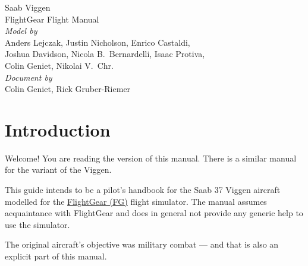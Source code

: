 
\usepackage[english]{babel}
\usepackage[utf8]{inputenc}
\usepackage[T1]{fontenc}
\usepackage{menukeys}
\usepackage{graphicx}
\usepackage{hyperref}
\usepackage{wallpaper}
\usepackage{xcolor}
\usepackage{geometry}
\usepackage{pdflscape}
\usepackage{gensymb}

\pagestyle{headings}


\begin{titlepage}
  \centering
  \sf
  {\Huge Saab  Viggen}
  \\[1cm]
  {\Huge FlightGear Flight Manual}
  \\[16cm]
  \color{white}
  \emph{Model by}\\
  Anders Lejczak, Justin Nicholson, Enrico Castaldi,\\
  Joshua Davidson, Nicola B.\ Bernardelli, Isaac Protiva,\\
  Colin Geniet, Nikolai V.\ Chr.\\
  \emph{Document by}\\
  Colin Geniet, Rick Gruber-Riemer
\end{titlepage}
\restoregeometry

\tableofcontents

\chapter{Introduction}

Welcome! You are reading the  version of this manual. There is a similar manual for the  variant of the Viggen.

This guide intends to be a pilot's handbook for the Saab 37 Viggen aircraft modelled for the \href{http://www.flightgear.org}{FlightGear (FG)} flight simulator. The manual assumes acquaintance with FlightGear and does in general not provide any generic help to use the simulator.

The original aircraft's objective was military combat --- and that is also an explicit part of this manual.

